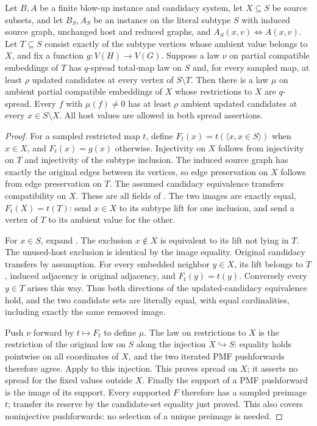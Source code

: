 \begin{lemma}
Let $B,A$ be a finite blow-up instance and candidacy system, let $X\subseteq S$
be source subsets, and let $B_S,A_S$ be an instance on the literal subtype
$S$ with induced source graph, unchanged host and reduced graphs, and
$A_S(x,v)\iff A(x,v)$. Let $T\subseteq S$ consist exactly of the subtype
vertices whose ambient value belongs to $X$, and fix a function
$g:V(H)\to V(G)$. Suppose a law $\nu$ on partial compatible embeddings
of $T$ has $q$-spread total-map law on $S$ and, for every sampled map,
at least $\rho$ updated candidates at every vertex of $S\setminus T$.
Then there is a law $\mu$ on ambient partial compatible embeddings of $X$
whose restrictions to $X$ are $q$-spread. Every $f$ with $\mu(f)\ne0$ has
at least $\rho$ ambient updated candidates at every $x\in S\setminus X$.
All host values are allowed in both spread assertions.
\end{lemma}
\begin{proof}
For a sampled restricted map $t$, define $F_t(x)=t(\langle x,x\in S\rangle)$
when $x\in X$, and $F_t(x)=g(x)$ otherwise. Injectivity on $X$ follows from
injectivity on $T$ and injectivity of the subtype inclusion. The induced
source graph has exactly the original edges between its vertices, so
edge preservation on $X$ follows from edge preservation on $T$.
The assumed candidacy equivalence transfers compatibility on $X$.
These are all fields of .
The two images are exactly equal, $F_t(X)=t(T)$: send $x\in X$ to its
subtype lift for one inclusion, and send a vertex of $T$ to its ambient
value for the other.

For $x\in S$, expand . The exclusion $x\notin X$
is equivalent to its lift not lying in $T$. The unused-host exclusion is
identical by the image equality. Original candidacy transfers by assumption.
For every embedded neighbor $y\in X$, its lift belongs to $T$, induced
adjacency is original adjacency, and $F_t(y)=t(y)$. Conversely every
$y\in T$ arises this way. Thus both directions of the updated-candidacy
equivalence hold, and the two candidate sets are literally equal, with
equal cardinalities, including exactly the same removed image.

Push $\nu$ forward by $t\mapsto F_t$ to define $\mu$. The law on restrictions
to $X$ is the restriction of the original law on $S$ along the injection
$X\hookrightarrow S$: equality holds pointwise on all coordinates of $X$,
and the two iterated PMF pushforwards therefore agree.
Apply  to this injection. This proves
spread on $X$; it asserts no spread for the fixed values outside $X$.
Finally the support of a PMF pushforward is the image of its support.
Every supported $F$ therefore has a sampled preimage $t$; transfer its
reserve by the candidate-set equality just proved. This also covers
noninjective pushforwards: no selection of a unique preimage is needed.
\end{proof}

